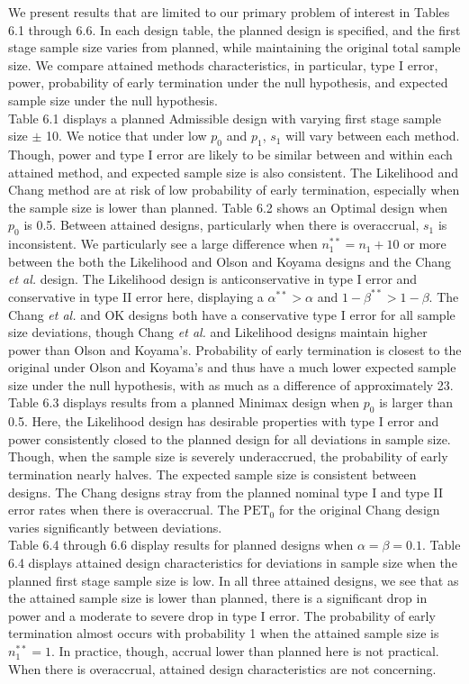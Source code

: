 \documentclass[12pt]{report}\usepackage[]{graphicx}\usepackage[]{color}
\newlength{\li}\setlength{\li}{14.48pt}
\newlength{\di}\setlength{\di}{-3.5mm}
\begin{document}
\indent We present results that are limited to our primary problem of interest in Tables 6.1 through 6.6. In each design table, the planned design is specified, and the first stage sample size varies from planned, while maintaining the original total sample size. We compare attained methods characteristics, in particular, type I error, power, probability of early termination under the null hypothesis, and expected sample size under the null hypothesis. \\
\indent Table 6.1 displays a planned Admissible design with varying first stage sample size $\pm$ 10. We notice that under low $p_0$ and $p_1$, $s_1$ will vary between each method. Though, power and type I error are likely to be similar between and within each attained method, and expected sample size is also consistent. The Likelihood and Chang method are at risk of low probability of early termination, especially when the sample size is lower than planned. Table 6.2 shows an Optimal design when $p_0$ is 0.5. Between attained designs, particularly when there is overaccrual, $s_1$ is inconsistent. We particularly see a large difference when $n_1^{\ast\ast} = n_1 + 10$ or more between the both the Likelihood and Olson and Koyama designs and the Chang \textit{et al.} design.  The Likelihood design is anticonservative in type I error and conservative in type II error here, displaying a $\alpha^{\ast\ast} > \alpha$ and $1-\beta^{\ast\ast} > 1-\beta$. The Chang \textit{et al.} and OK designs both have a conservative type I error for all sample size deviations, though Chang \textit{et al.} and Likelihood designs maintain higher power than Olson and Koyama's. Probability of early termination is closest to the original under Olson and Koyama's and thus have a much lower expected sample size under the null hypothesis, with as much as a difference of approximately 23.\\
\indent Table 6.3 displays results from a planned Minimax design when $p_0$ is larger than 0.5. Here, the Likelihood design has desirable properties with type I error and power consistently closed to the planned design for all deviations in sample size. Though, when the sample size is severely underaccrued, the probability of early termination nearly halves. The expected sample size is consistent between designs. The Chang designs stray from the planned nominal type I and type II error rates when there is overaccrual. The $\mbox{PET}_0$ for the original Chang design varies significantly between deviations. \\
\indent Table 6.4 through 6.6 display results for planned designs when $\alpha = \beta = 0.1$. Table 6.4 displays attained design characteristics for deviations in sample size when the planned first stage sample size is low. In all three attained designs, we see that as the attained sample size is lower than planned, there is a significant drop in power and a moderate to severe drop in type I error. The probability of early termination almost occurs with probability 1 when the attained sample size is $n_1^{\ast\ast} = 1$. In practice, though, accrual lower than planned here is not practical. When there is overaccrual, attained design characteristics are not concerning. \\
\end{document}
